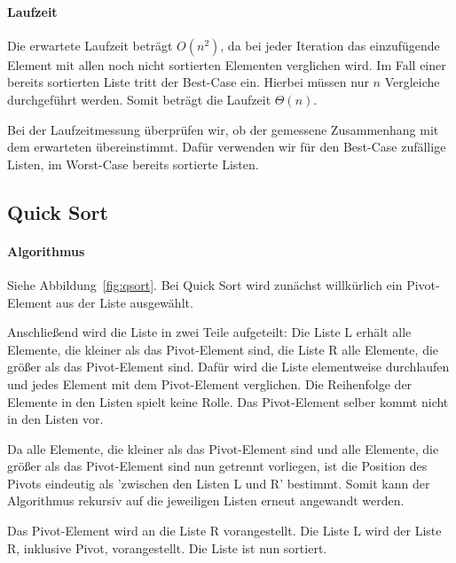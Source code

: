 \paragraph{Laufzeit}\label{subsubsec:ilaufzeit}
Die erwartete Laufzeit beträgt \(O(n^2)\), da bei jeder Iteration das
einzufügende Element mit allen noch nicht sortierten Elementen verglichen
wird.
Im Fall einer bereits sortierten Liste tritt der Best-Case ein.
Hierbei müssen nur \(n\) Vergleiche durchgeführt werden.
Somit beträgt die Laufzeit \(\Theta(n)\).

Bei der Laufzeitmessung überprüfen wir, ob der gemessene Zusammenhang mit
dem erwarteten übereinstimmt.
Dafür verwenden wir für den Best-Case zufällige Listen, im Worst-Case
bereits sortierte Listen.


\subsection{Quick Sort}\label{subsec:quick-sort}

\paragraph{Algorithmus}\label{subsec:Qalgorithmus}
Siehe Abbildung~\ref{fig:qsort}.
Bei Quick Sort wird zunächst willkürlich ein Pivot-Element aus der Liste
ausgewählt.

Anschließend wird die Liste in zwei Teile aufgeteilt: Die Liste L erhält
alle Elemente, die kleiner als das Pivot-Element sind, die Liste R alle
Elemente, die größer als das Pivot-Element sind.
Dafür wird die Liste elementweise durchlaufen und jedes Element mit dem
Pivot-Element verglichen.
Die Reihenfolge der Elemente in den Listen spielt keine Rolle.
Das Pivot-Element selber kommt nicht in den Listen vor.

Da alle Elemente, die kleiner als das Pivot-Element sind und alle Elemente,
die größer als das Pivot-Element sind nun getrennt vorliegen, ist die
Position des Pivots eindeutig als 'zwischen den Listen L und R' bestimmt.
Somit kann der Algorithmus rekursiv auf die jeweiligen Listen erneut
angewandt werden.

Das Pivot-Element wird an die Liste R vorangestellt.
Die Liste L wird der Liste R, inklusive Pivot, vorangestellt.
Die Liste ist nun sortiert.\\

